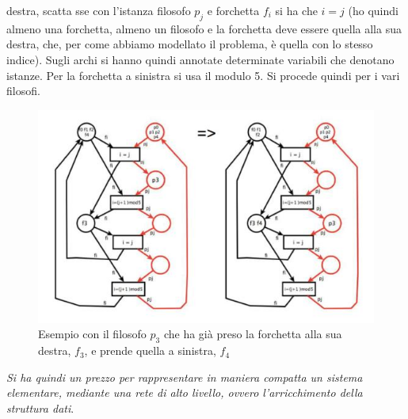 \documentclass[a4paper,12pt, oneside]{book}
\begin{document}
destra, scatta sse con l'istanza filosofo $p_j$ e forchetta $f_i$ si ha che
$i=j$ (ho quindi almeno una forchetta, almeno un filosofo e la forchetta deve
essere quella alla sua destra, che, per come abbiamo modellato il problema, è
quella con lo stesso indice). Sugli archi si hanno quindi annotate determinate
variabili che denotano istanze. Per la forchetta a sinistra si usa il modulo
5. Si procede quindi per i vari filosofi.
\begin{figure}[H]
  \centering
  \includegraphics[scale = 0.5]{img/pt19.jpg}
  \caption{Esempio con il filosofo $p_3$ che ha già preso la forchetta alla sua
    destra, $f_3$, e prende quella a sinistra, $f_4$}
\end{figure}
\textit{Si ha quindi un prezzo per rappresentare in maniera compatta un sistema
  elementare, mediante una rete di alto livello, ovvero l'arricchimento della
  struttura dati}.
\end{document}
